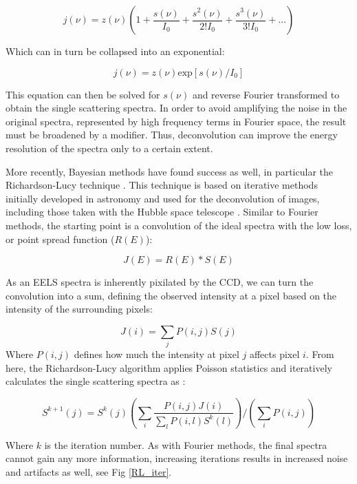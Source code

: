 \begin{equation}
	j(\nu) = z(\nu) \left(1+\frac{s(\nu)}{I_0}+   \frac{s^2(\nu)}{2! I_0}+ \frac{s^3(\nu)}{3! I_0} + ...\right)
	\label{fourier_spectra}
\end{equation} 

Which can in turn be collapsed into an exponential:

\begin{equation}
	j(\nu) = z(\nu)\mathrm{exp}[s(\nu)/I_0]
\end{equation}

This equation can then be solved for $s(\nu)$ and reverse Fourier transformed to obtain the single scattering spectra.  In order to avoid amplifying the noise in the original spectra,  represented by high frequency terms in Fourier space, the result must be broadened by a modifier.  Thus, deconvolution can improve the energy resolution of the spectra only to a certain extent.  

More recently, Bayesian methods have found success as well, in particular the Richardson-Lucy technique \cite{richardson_lucy}. This technique is based on iterative methods initially developed in astronomy and used for the deconvolution of images, including those taken with the Hubble space telescope \cite{hubble}.  Similar to Fourier methods, the starting point is a convolution of the ideal spectra with the low loss, or point spread function ($R(E)$):

\begin{equation}
J(E) = R(E)\ast S(E)
\end{equation}

As an EELS spectra is inherently pixilated by the CCD, we can turn the convolution into a sum, defining the observed intensity at a pixel based on the intensity of the surrounding pixels: 

\begin{equation}
	J(i) = \sum_{j} P(i,j) S(j)
\end{equation}
Where $P(i,j)$ defines how much the intensity at pixel $j$ affects pixel $i$.  
From here, the Richardson-Lucy algorithm applies Poisson statistics and iteratively calculates the single scattering spectra as  \cite{richardson_lucy}:  

\begin{equation}
S^{k+1}(j) = S^k(j) \left(\sum_{i} \frac{P(i,j)J(i)}{\sum_{l}P(i,l)S^k(l)}\right) \bigg/ \left( \sum_{i} P(i,j)\right)
\end{equation}

Where $k$ is the iteration number.  As with Fourier methods, the final spectra cannot gain any more information, increasing iterations results in increased noise and artifacts as well, see Fig \ref{RL_iter}.  

